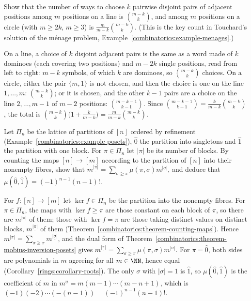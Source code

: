 \begin{exercise}\label{combinatorics:exercise-circular-choices}
Show that the number of ways to choose $k$ pairwise disjoint pairs of adjacent positions among $m$ positions on a line is $\binom{m - k}{k}$, and among $m$ positions on a circle (with $m \geq 2k$,
$m \geq 3$) is $\frac{m}{m - k}\binom{m - k}{k}$. (This is the key count in Touchard's solution of the m\'enage problem, Example~\ref{combinatorics:example-menages}.)
\end{exercise}

\begin{solution}
On a line, a choice of $k$ disjoint adjacent pairs is the same as a word made of $k$ dominoes (each covering two positions) and $m - 2k$ single positions, read from left to right: $m - k$ symbols, of
which $k$ are dominoes, so $\binom{m - k}{k}$ choices. On a circle, either the pair $\{m, 1\}$ is not chosen, and then the choice is one on the line $1, \ldots, m$: $\binom{m - k}{k}$; or it is chosen, and
the other $k - 1$ pairs are a choice on the line $2, \ldots, m - 1$ of $m - 2$ positions: $\binom{m - k - 1}{k - 1}$. Since $\binom{m-k-1}{k-1} = \frac{k}{m-k}\binom{m-k}{k}$, the total is
$\binom{m-k}{k}\bigl(1 + \frac{k}{m-k}\bigr) = \frac{m}{m-k}\binom{m-k}{k}$.
\end{solution}

\begin{exercise}\label{combinatorics:exercise-mobius-partition-lattice}
Let $\Pi_n$ be the lattice of partitions of $[n]$ ordered by refinement (Example~\ref{combinatorics:example-posets}), $\hat0$ the partition into singletons and $\hat1$ the partition with one block. For
$\pi \in \Pi_n$ let $|\pi|$ be its number of blocks. By counting the maps $[n] \to [m]$ according to the partition of $[n]$ into their nonempty fibres, show that
$m^{\underline{|\pi|}} = \sum_{\sigma \geq \pi}\mu(\pi, \sigma)m^{|\sigma|}$, and deduce that $\mu(\hat0, \hat1) = (-1)^{n-1}(n - 1)!$.
\end{exercise}

\begin{solution}
For $f \colon [n] \to [m]$ let $\ker f \in \Pi_n$ be the partition into the nonempty fibres. For $\pi \in \Pi_n$, the maps with $\ker f \geq \pi$ are those constant on each block of $\pi$, so there are
$m^{|\pi|}$ of them; those with $\ker f = \pi$ are those taking distinct values on distinct blocks, $m^{\underline{|\pi|}}$ of them (Theorem~\ref{combinatorics:theorem-counting-maps}). Hence
$m^{|\pi|} = \sum_{\sigma \geq \pi}m^{\underline{|\sigma|}}$, and the dual form of Theorem~\ref{combinatorics:theorem-mobius-inversion-posets} gives
$m^{\underline{|\pi|}} = \sum_{\sigma \geq \pi}\mu(\pi, \sigma)m^{|\sigma|}$. For $\pi = \hat0$, both sides are polynomials in $m$ agreeing for all $m \in \NN$, hence equal
(Corollary~\ref{rings:corollary-roots}). The only $\sigma$ with $|\sigma| = 1$ is $\hat1$, so $\mu(\hat0, \hat1)$ is the coefficient of $m$ in $m^{\underline{n}} = m(m - 1) \cdots (m - n + 1)$, which is
$(-1)(-2) \cdots (-(n - 1)) = (-1)^{n-1}(n - 1)!$.
\end{solution}


